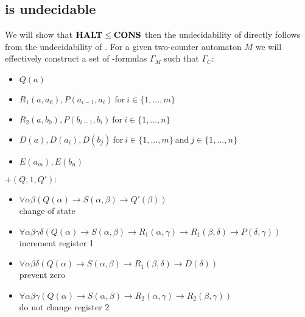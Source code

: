 \subsection{\PCons{} is undecidable}
We will show that $\textbf{HALT}\leq\textbf{CONS}$ then the undecidability of \PCons{} directly follows from the undecidability of \autHalt. For a given two-counter automaton $M$ we will effectively construct a set of \SysP-formulas $\Gamma_M$ such that 
$\Gamma_C:$
\begin{itemize}
	\item $Q(a)$
	\item $R_1(a,a_0),P(a_{i-1},a_i)~\text{for}~i\in\{1,\dots,m\}$
	\item $R_2(a,b_0),P(b_{i-1},b_i)~\text{for}~i\in\{1,\dots,n\}$
	\item $D(a),D(a_i),D(b_j)~\text{for}~i\in\{1,\dots,m\}~\text{and}~j\in\{1,\dots,n\}$
	\item $E(a_m),E(b_n)$
\end{itemize}

$+(Q,1,Q'):$
\begin{itemize}
	\item $\forall\alpha\beta(Q(\alpha)\to S(\alpha,\beta)\to Q'(\beta))$ \\change of state
	\item $\forall\alpha\beta\gamma\delta(Q(\alpha)\to S(\alpha,\beta)\to R_1(\alpha,\gamma)\to R_1(\beta,\delta)\to P(\delta,\gamma))$\\increment register 1
	\item $\forall\alpha\beta\delta(Q(\alpha)\to S(\alpha,\beta)\to R_1(\beta,\delta)\to D(\delta))$ \\prevent zero
	\item $\forall\alpha\beta\gamma(Q(\alpha)\to S(\alpha,\beta)\to R_2(\alpha,\gamma)\to R_2(\beta,\gamma))$ \\do not change register 2
\end{itemize}

